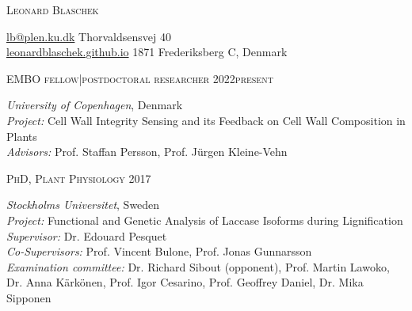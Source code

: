 \documentclass[11pt]{article}
\begin{document}
	\setlength\parindent{15pt}
\begin{center}
	\huge{\textsc{Leonard Blaschek}}
	\vspace*{0.5cm}
\end{center}

\noindent
\href{mailto:lb@plen.ku.dk}{lb@plen.ku.dk} \hfill Thorvaldsensvej 40\\
\href{https://leonardblaschek.github.io}{leonardblaschek.github.io} \hfill 1871 Frederiksberg C, Denmark%

\vspace{1.5cm}
\raggedright
	
\vspace{0.15cm}
\begin{addmargin}[15pt]{0pt}
\textsc{\large{EMBO fellow|postdoctoral researcher} \hfill \textsc{2022\textendash present}}
\end{addmargin}
\begin{addmargin}[24pt]{0pt}
	\textit{University of Copenhagen}, Denmark\\
	\textit{Project:} Cell Wall Integrity Sensing and its Feedback on Cell Wall Composition in Plants \\
	\textit{Advisors:} Prof. Staffan Persson, Prof. Jürgen Kleine-Vehn\\
\end{addmargin}
\vspace{0.5cm}
	
\vspace{0.15cm}

\begin{addmargin}[15pt]{0pt}
\textsc{\large{PhD, Plant Physiology} \hfill \textsc{2017}}
\end{addmargin}
\begin{addmargin}[24pt]{0pt}
	\textit{Stockholms Universitet}, Sweden \\
	\textit{Project:} Functional and Genetic Analysis of Laccase Isoforms during Lignification \\
	\textit{Supervisor:} Dr. Edouard Pesquet \\
	\textit{Co-Supervisors:} Prof. Vincent Bulone, Prof. Jonas Gunnarsson\\
	\textit{Examination committee:} Dr. Richard Sibout (opponent), Prof. Martin Lawoko, Dr. Anna Kärkönen, Prof. Igor Cesarino, Prof. Geoffrey Daniel, Dr. Mika Sipponen
\end{addmargin}
\vspace{0.2cm}
\end{document}
